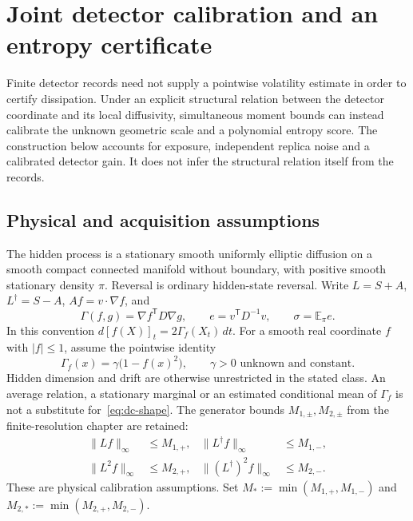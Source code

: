 \chapter[Joint detector calibration]{Joint detector calibration and an entropy certificate}
\label{ch:dc-calibration}

Finite detector records need not supply a pointwise volatility estimate in
order to certify dissipation.  Under an explicit structural relation between
the detector coordinate and its local diffusivity, simultaneous moment bounds
can instead calibrate the unknown geometric scale and a polynomial entropy
score.  The construction below accounts for exposure, independent replica
noise and a calibrated detector gain.  It does not infer the structural
relation itself from the records.

\section{Physical and acquisition assumptions}

The hidden process is a stationary smooth uniformly elliptic diffusion on a
smooth compact connected manifold without boundary, with positive smooth
stationary density $\pi$.  Reversal is ordinary hidden-state reversal.  Write
$L=S+A$, $L^\dagger=S-A$, $Af=v\cdot\nabla f$, and
\[
 \Gamma(f,g)=\nabla f^{\mathsf T}D\nabla g,\qquad
 e=v^{\mathsf T}D^{-1}v,\qquad \sigma=\mathbb E_\pi e.
\]
In this convention $d[f(X)]_t=2\Gamma_f(X_t)\,dt$.  For a smooth real
coordinate $f$ with $|f|\le1$, assume the pointwise identity
\begin{equation}
 \Gamma_f(x)=\gamma\bigl(1-f(x)^2\bigr),\qquad
 \gamma>0\text{ unknown and constant}.
 \label{eq:dc-shape}
\end{equation}
Hidden dimension and drift are otherwise unrestricted in the stated class.
An average relation, a stationary marginal or an estimated conditional mean
of $\Gamma_f$ is not a substitute for~\eqref{eq:dc-shape}.  The generator
bounds $M_{1,\pm},M_{2,\pm}$ from the finite-resolution chapter are retained:
\begin{align*}
 \|Lf\|_\infty&\le M_{1,+},&
 \|L^\dagger f\|_\infty&\le M_{1,-},\\
 \|L^2f\|_\infty&\le M_{2,+},&
 \|(L^\dagger)^2f\|_\infty&\le M_{2,-}.
\end{align*}
These are physical calibration assumptions.  Set
$M_*:=\min(M_{1,+},M_{1,-})$ and
$M_{2,*}:=\min(M_{2,+},M_{2,-})$.

